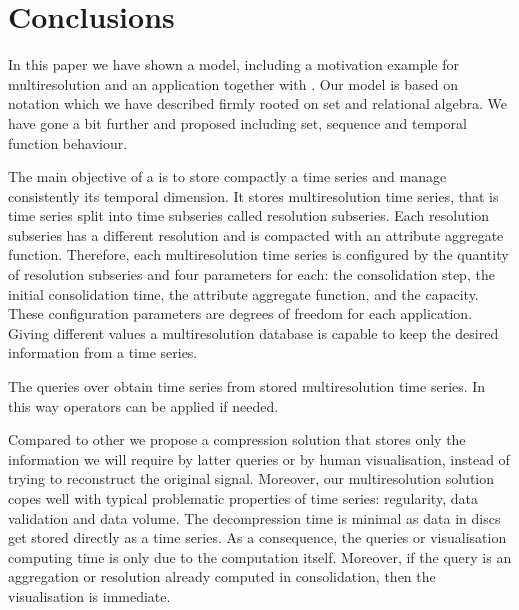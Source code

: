 


\section{Conclusions}
\label{sec:concl-future-work}


In this paper we have shown a  model, including a
motivation example for multiresolution and an application together
with . Our  model is based on 
notation which we have described firmly rooted on set and relational
algebra. We have gone a bit further and proposed  including
set, sequence and temporal function behaviour.



The main objective of a  is to store compactly a time
series and manage consistently its temporal dimension.  It stores
multiresolution time series, that is time series split into time
subseries called resolution subseries.  Each resolution subseries has
a different resolution and is compacted with an attribute aggregate
function. Therefore, each multiresolution time series is configured by
the quantity of resolution subseries and four parameters for each: the
consolidation step, the initial consolidation time, the attribute
aggregate function, and the capacity.  These configuration parameters
are degrees of freedom for each application. Giving different
values a multiresolution database is capable to keep the desired
information from a time series.



The queries over  obtain time series from stored
multiresolution time series. In this way  operators can be
applied if needed.


Compared to other  we propose a compression solution that
stores only the information we will require by latter queries or by
human visualisation, instead of trying to reconstruct the original
signal.  Moreover, our multiresolution solution copes well with
typical problematic properties of time series: regularity, data
validation and data volume.  The decompression time is minimal as data
in discs get stored directly as a time series. As a consequence, the
queries or visualisation computing time is only due to the computation
itself. Moreover, if the query is an aggregation or resolution already
computed in  consolidation, then the visualisation is
immediate.


